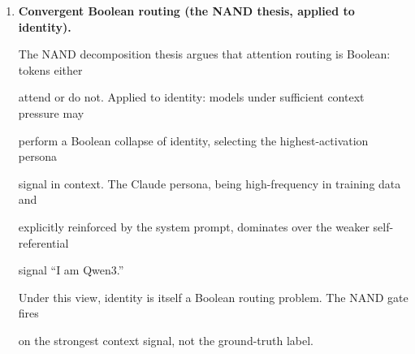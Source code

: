 \begin{enumerate}
\begin{itemize}
  \item Synthetic data generated by Claude models and labeled as high-quality





\end{itemize}





If Qwen3's RLHF reward model was calibrated on Claude outputs --- directly or via





distillation --- then the persona bleed is not merely contextual but structural:





Qwen's identity representation is partially encoded in Claude's latent space.











\item \textbf{Convergent Boolean routing (the NAND thesis, applied to identity).}





The NAND decomposition thesis argues that attention routing is Boolean: tokens either





attend or do not. Applied to identity: models under sufficient context pressure may





perform a Boolean collapse of identity, selecting the highest-activation persona





signal in context. The Claude persona, being high-frequency in training data and





explicitly reinforced by the system prompt, dominates over the weaker self-referential





signal ``I am Qwen3.''











Under this view, identity is itself a Boolean routing problem. The NAND gate fires





on the strongest context signal, not the ground-truth label.











\end{enumerate}
